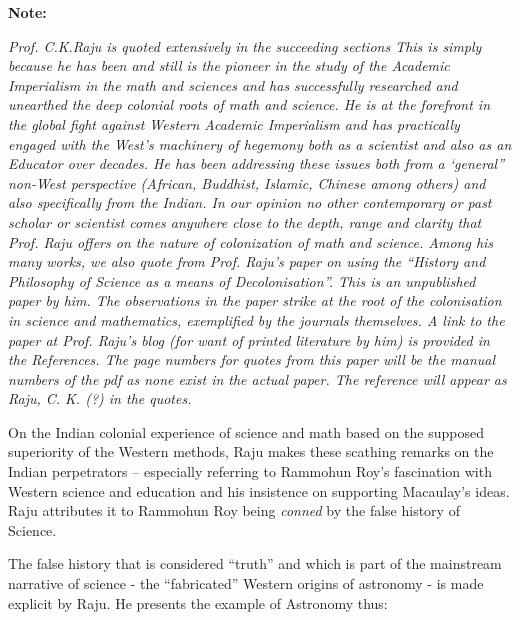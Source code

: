 \vskip 4pt

\textbf{Note:}

\vskip 4pt

\textit{Prof. C.K.Raju is quoted extensively in the succeeding sections This is simply because he has been and still is the pioneer in the study of the Academic Imperialism in the math and sciences and has successfully researched and unearthed the deep colonial roots of math and science. He is at the forefront in the global fight against Western Academic Imperialism and has practically engaged with the West’s machinery of hegemony both as a scientist and also as an Educator over decades. He has been addressing these issues both from a ‘general” non-West perspective (African, Buddhist, Islamic, Chinese among others) and also specifically from the Indian. In our opinion no other contemporary or past scholar or scientist comes anywhere close to the depth, range and clarity that Prof. Raju offers on the nature of colonization of math and science. Among his many works, we also quote from Prof. Raju’s paper on using the “History and Philosophy of Science as a means of Decolonisation”. This is an unpublished paper by him. The observations in the paper strike at the root of the colonisation in science and mathematics, exemplified by the journals themselves. A link to the paper at Prof. Raju’s blog (for want of printed literature by him) is provided in the References. The page numbers for quotes from this paper will be the manual numbers of the pdf as none exist in the actual paper. The reference will appear as Raju, C. K. (?) in the quotes.}

\vskip 3pt

On the Indian colonial experience of science and math based on the supposed superiority of the Western methods, Raju makes these scathing remarks on the Indian perpetrators – especially referring to Rammohun Roy’s fascination with Western science and education and his insistence on supporting Macaulay’s ideas. Raju attributes it to Rammohun Roy being \textit{conned} by the false history of Science.

The false history that is considered “truth” and which is part of the mainstream narrative of science - the “fabricated” Western origins of astronomy - is made explicit by Raju. He presents the example of Astronomy thus:

